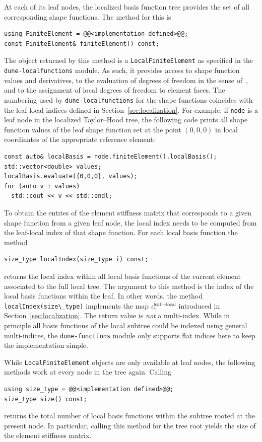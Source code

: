 \documentclass[a4paper,10pt,headings=normal,bibliography=totoc]{scrartcl}
\newcommand{\cpp}[1]{\lstinline[basicstyle=\ttfamily]!#1!}
\newcommand{\dunemodule}[1]{\texttt{#1}}
\begin{document}
At each of its leaf nodes, the localized basis function tree provides the set
of all corresponding shape functions.
The method for this is
\begin{lstlisting}[style=Interface]
using FiniteElement = @@<implementation defined>@@;
const FiniteElement& finiteElement() const;
\end{lstlisting}
The object returned by this method is a \cpp{LocalFiniteElement} as specified
in the \dunemodule{dune-localfunctions} module. As such, it provides access
to shape function values and derivatives, to the evaluation of degrees of freedom
in the sense of~\cite{ciarlet:1978}, and to the assignment of local degrees of
freedom to element faces.
The numbering used by \dunemodule{dune-localfunctions} for the shape functions
coincides with the leaf-local indices defined in Section~\ref{sec:localization}.
For example, if \cpp{node} is a leaf node in the localized Taylor--Hood tree,
the following code prints all shape function values of the leaf shape function set
at the point $(0,0,0)$ in local coordinates of the appropriate reference element:
%
\begin{lstlisting}[style=Example]
const auto& localBasis = node.finiteElement().localBasis();
std::vector<double> values;
localBasis.evaluate({0,0,0}, values);
for (auto v : values)
  std::cout << v << std::endl;
\end{lstlisting}
%

To obtain the entries of the element stiffness matrix that corresponds to a
given shape function from a given leaf node, the local index needs to be computed
from the leaf-local index of that shape function.
For each local basis function the method
\begin{lstlisting}[style=Interface]
size_type localIndex(size_type i) const;
\end{lstlisting}
returns the
local index within all local basis functions of the current element associated to the full
local tree.
The argument to this method is the
index of the local basis functions within the leaf.
In other words, the method \cpp{localIndex(size\_type)}
implements the map $\iota^{\text{leaf}\to\text{local}}_e$
introduced in Section~\ref{sec:localization}.
The return value is \emph{not} a multi-index.
While in principle all basis functions of the local subtree could be indexed using
general multi-indices, the \dunemodule{dune-functions} module only supports
flat indices here to keep the implementation simple.

While \cpp{LocalFiniteElement} objects are only available at leaf nodes,
the following methods work at every node in the tree again.
Calling
\begin{lstlisting}[style=Interface]
using size_type = @@<implementation defined>@@;
size_type size() const;
\end{lstlisting}
returns the total number of
local basis functions within the subtree rooted at the
present node.  In particular, calling this method for the tree root
yields the size of the element stiffness matrix.
\end{document}
